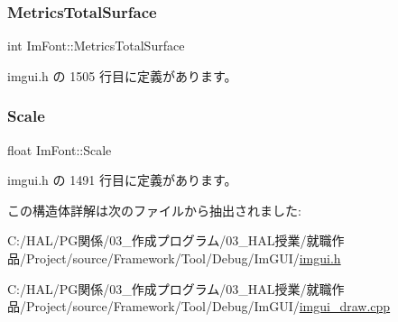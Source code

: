 \subsubsection{\texorpdfstring{Metrics\+Total\+Surface}{MetricsTotalSurface}}
{\footnotesize\ttfamily int Im\+Font\+::\+Metrics\+Total\+Surface}



 imgui.\+h の 1505 行目に定義があります。

\mbox{\label{struct_im_font_ae98fb07fd8862a7243d77b11f38bba19}} 
\subsubsection{\texorpdfstring{Scale}{Scale}}
{\footnotesize\ttfamily float Im\+Font\+::\+Scale}



 imgui.\+h の 1491 行目に定義があります。



この構造体詳解は次のファイルから抽出されました\+:\begin{DoxyCompactItemize}
\item 
C\+:/\+H\+A\+L/\+P\+G関係/03\+\_\+作成プログラム/03\+\_\+\+H\+A\+L授業/就職作品/\+Project/source/\+Framework/\+Tool/\+Debug/\+Im\+G\+U\+I/\mbox{\hyperlink{imgui_8h}{imgui.\+h}}\item 
C\+:/\+H\+A\+L/\+P\+G関係/03\+\_\+作成プログラム/03\+\_\+\+H\+A\+L授業/就職作品/\+Project/source/\+Framework/\+Tool/\+Debug/\+Im\+G\+U\+I/\mbox{\hyperlink{imgui__draw_8cpp}{imgui\+\_\+draw.\+cpp}}\end{DoxyCompactItemize}
